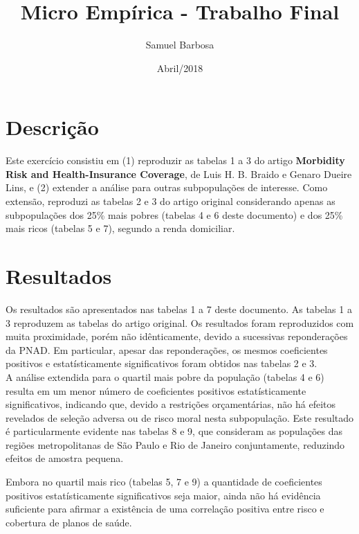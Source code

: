 \documentclass{article}
\begin{document}
\title{Micro Empírica - Trabalho Final}
\date{Abril/2018}
\author{Samuel Barbosa}

\maketitle

\section{Descrição}

Este exercício consistiu em (1) reproduzir as tabelas 1 a 3 do artigo \textbf{Morbidity Risk and Health-Insurance Coverage}, de Luis H. B. Braido e Genaro Dueire Lins, e (2) extender a análise para outras subpopulações de interesse. Como extensão, reproduzi as tabelas 2 e 3 do artigo original considerando apenas as subpopulações dos 25\% mais pobres (tabelas 4 e 6 deste documento) e dos 25\% mais ricos (tabelas 5 e 7), segundo a renda domiciliar.

\section{Resultados}

Os resultados são apresentados nas tabelas 1 a 7 deste documento. As tabelas 1 a 3 reproduzem as tabelas do artigo original.  Os resultados foram reproduzidos com muita proximidade, porém não idênticamente, devido a sucessivas reponderações da PNAD. Em particular, apesar das reponderações, os mesmos coeficientes positivos e estatísticamente significativos foram obtidos nas tabelas 2 e 3. \\

A análise extendida para o quartil mais pobre da população (tabelas 4 e 6) resulta em um menor número de coeficientes positivos estatísticamente significativos, indicando que, devido a restrições orçamentárias, não há efeitos revelados de seleção adversa ou de risco moral nesta subpopulação. Este resultado é particularmente evidente nas tabelas 8 e 9, que consideram as populações das regiões metropolitanas de São Paulo e Rio de Janeiro conjuntamente, reduzindo efeitos de amostra pequena.

 Embora no quartil mais rico (tabelas 5, 7 e 9) a quantidade de coeficientes positivos estatísticamente significativos seja maior, ainda não há evidência suficiente para afirmar a existência de uma correlação positiva entre risco e cobertura de planos de saúde.
\end{document}
